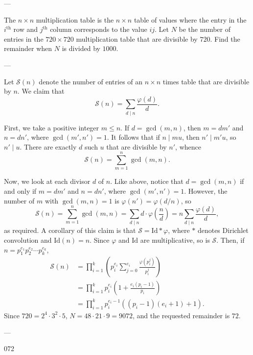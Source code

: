 
---

The $n \times n$ multiplication table is the $n \times n$ table of values where the entry in the $i^{\text{th}}$ row and $j^{\text{th}}$ column corresponds to the value $ij.$ Let $N$ be the number of entries in the $720 \times 720$ multiplication table that are divisible by $720.$ Find the remainder when $N$ is divided by $1000.$

---

Let $\mathcal S(n)$ denote the number of entries of an $n\times n$ times table that are divisible by $n$. We claim that $$\mathcal S(n)=\sum_{d\mid n}\frac{\varphi(d)}d.$$

First, we take a positive integer $m\le n$. If $d=\gcd(m,n)$, then $m=dm'$ and $n=dn'$, where $\gcd(m',n')=1$. It follows that if $n\mid mu$, then $n'\mid m'u$, so $n'\mid u$. There are exactly $d$ such $u$ that are divisible by $n'$, whence $$\mathcal S(n)=\sum_{m=1}^n \gcd(m,n).$$

Now, we look at each divisor $d$ of $n$. Like above, notice that $d=\gcd(m,n)$ if and only if $m=dm'$ and $n=dn'$, where $\gcd(m',n')=1$. However, the number of $m$ with $\gcd(m,n)=1$ is $\varphi(n')=\varphi(d/n)$, so $$\mathcal S(n)=\sum_{m=1}^n\gcd(m,n)=\sum_{d\mid n}d\cdot\varphi\left(\frac{n}{d}\right)=n\sum_{d\mid n}\frac{\varphi(d)}{d},$$
as required. A corollary of this claim is that $\mathcal S=\text{Id}*\varphi$, where $*$ denotes Dirichlet convolution and $\text{Id}(n)=n$. Since $\varphi$ and $\text{Id}$ are multiplicative, so is $\mathcal S$. Then, if $n=p_1^{e_1}p_2^{e_2}\cdots p_k^{e_k}$,
\begin{align*}
    \mathcal S(n)&=\prod_{i=1}^k\left(p_i^{e_i}\sum_{j=0}^{e_i}\frac{\varphi(p_i^j)}{p_i^j}\right)\\
    &=\prod_{i=1}^k p_i^{e_i}\left(1+\frac{e_i(p_i-1)}{p_i}\right)\\
    &=\prod_{i=1}^k p_i^{e_i-1}((p_i-1)(e_i+1)+1).
\end{align*}
Since $720=2^4\cdot 3^2\cdot 5$, $N=48\cdot 21\cdot 9=9072$, and the requested remainder is $72$.

---

072
